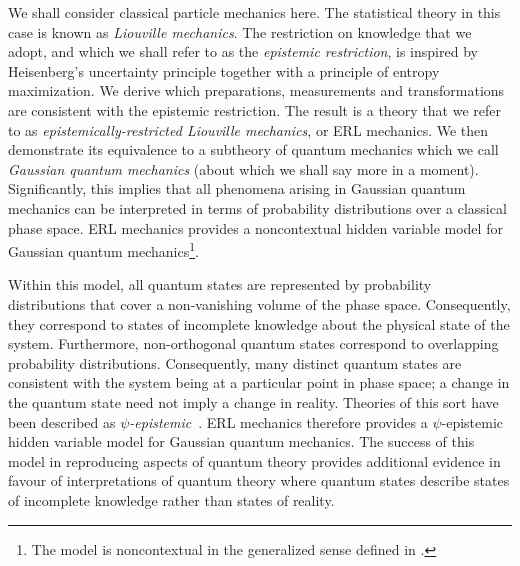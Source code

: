 \documentclass[pra,superscriptaddress,nofootinbib,12pt]{revtex4-2}
\begin{document}
We shall consider classical particle mechanics here.  The statistical
theory in this case is known as \emph{Liouville mechanics}. The restriction
on knowledge that we adopt, and which we shall refer to as the \emph{epistemic restriction}, is inspired by Heisenberg's uncertainty principle
together with a principle of entropy maximization.  We derive which
preparations, measurements and transformations are consistent with the
epistemic restriction.  The result is a theory that we refer to as \emph{epistemically-restricted Liouville mechanics}, or ERL mechanics.  We then demonstrate its
equivalence to a subtheory of quantum mechanics which we call \emph{Gaussian
quantum mechanics} (about which we shall say more in a moment).  Significantly, this
implies that all phenomena arising in Gaussian quantum mechanics can be
interpreted in terms of probability distributions over a classical phase
space.  ERL mechanics provides a noncontextual hidden variable model for Gaussian quantum mechanics\footnote{The model is noncontextual in the generalized sense defined in \cite{Spe05}.}.

Within this model, all quantum states are represented by probability distributions that cover a non-vanishing volume of the phase space.  Consequently, they correspond to states of incomplete knowledge about the physical state of the system.  Furthermore, non-orthogonal quantum states correspond to overlapping probability distributions. Consequently, many distinct quantum states are consistent with the system being at a particular point in phase space; a change in the quantum state need not imply a change in reality.  Theories of this sort have been described as $\psi$\emph{-epistemic}~\cite{Spe07,Har10}.  ERL mechanics therefore provides a $\psi$-epistemic hidden variable
model for Gaussian quantum mechanics. The success of this model in reproducing aspects of quantum theory provides additional evidence in favour of interpretations of quantum theory where quantum states describe states of incomplete knowledge rather than states of reality.
\end{document}
